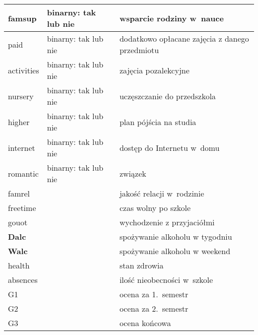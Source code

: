 \begin{table}[h]
\begin{tabular}{|p{1.4cm}|p{3cm}|p{3cm}|}
famsup   &   binarny: tak lub nie   &   wsparcie rodziny w~nauce \\ \hline
paid  &  binarny: tak lub nie    &  dodatkowo opłacane zajęcia z danego przedmiotu  \\ \hline
activities   &  binarny: tak lub nie  &  zajęcia pozalekcyjne    \\ \hline
nursery   &   binarny: tak lub nie   &   uczęszczanie do przedszkola \\ \hline
higher   &  binarny: tak lub nie   &  plan pójścia na studia  \\ \hline
internet   &   binarny: tak lub nie   &  dostęp do Internetu w~domu  \\ \hline
romantic   &   binarny: tak lub nie   &   związek \\ \hline
famrel  &      & jakość relacji w~rodzinie  \\ \hline
freetime   &      & czas wolny po szkole   \\ \hline
gouot   &      &  wychodzenie z przyjaciółmi  \\ \hline
\textbf{Dalc}  &      & spożywanie alkoholu w tygodniu   \\ \hline
\textbf{Walc}   &      &  spożywanie alkoholu w weekend  \\ \hline
health   &      & stan zdrowia   \\ \hline
absences  &      &  ilość nieobecności w~szkole  \\ \hline
G1  &      &   ocena za 1.~semestr \\ \hline
G2  &      &  ocena za 2.~semestr  \\ \hline
G3   &      &  ocena końcowa  \\ \hline
\end{tabular}
\end{table}